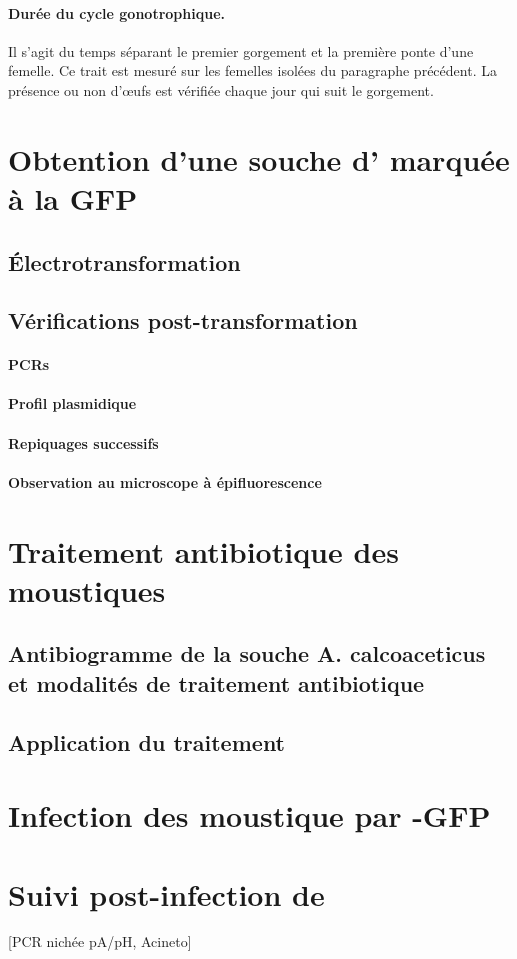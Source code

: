 \paragraph{Durée du cycle gonotrophique.} Il s'agit du temps séparant le premier gorgement et la première ponte d'une femelle. Ce trait est mesuré sur les femelles isolées du paragraphe précédent. La présence ou non d'\oe{}ufs est vérifiée chaque jour qui suit le gorgement.

\section{Obtention d'une souche d' marquée à la GFP}

\subsection{Électrotransformation}



\subsection{Vérifications post-transformation}

\paragraph{PCRs}
\paragraph{Profil plasmidique}
\paragraph{Repiquages successifs}
\paragraph{Observation au microscope à épifluorescence}

\section{Traitement antibiotique des moustiques}

\subsection{Antibiogramme de la souche A. calcoaceticus et modalités de traitement antibiotique}

\subsection{Application du traitement}

\section{Infection des moustique par -GFP}

\section{Suivi post-infection de }

[PCR nichée pA/pH, Acineto]